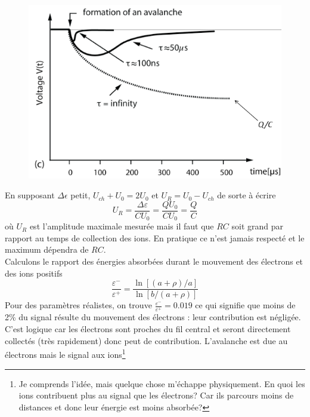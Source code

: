 	\begin{figure}
	\vspace{-5mm}
	\includegraphics[scale=0.35]{ch8/image7}
	\end{figure}

En supposant $\Delta\epsilon$ petit, $U_{ch}+U_0=2U_0$ et $U_R=U_0-U_{ch}$ de sorte à écrire
\begin{equation}
U_R=\frac{\Delta\varepsilon}{CU_0}=\frac{QU_0}{CU_0}=\frac{Q}{C}
\end{equation}
où $U_R$ est l'amplitude maximale mesurée mais il faut que $RC$ soit grand par rapport au temps 
de collection des ions. En pratique ce n'est jamais respecté et le maximum dépendra de $RC$.\\

Calculons le rapport des énergies absorbées durant le mouvement des électrons et des ions positifs
\begin{equation}
\frac{\varepsilon^-}{\varepsilon^+}=\frac{\ln{[(a+\rho)/a]}}{\ln{[b/(a +\rho)]}}
\end{equation}
Pour des paramètres réalistes, on trouve $\frac{\varepsilon^-}{\varepsilon^+}=0.019$ ce qui signifie
que moins de 2\% du signal résulte du mouvement des électrons : leur contribution est négligée. C'est
logique car les électrons sont proches du fil central et seront directement collectés (très 
rapidement) donc peut de contribution. L'avalanche est due au électrons mais le signal aux 
ions\footnote{Je comprends l'idée, mais quelque chose m'échappe physiquement. En quoi les ions 
contribuent plus au signal que les électrons? Car ils parcours moins de distances et donc leur 
énergie est moins absorbée?}


